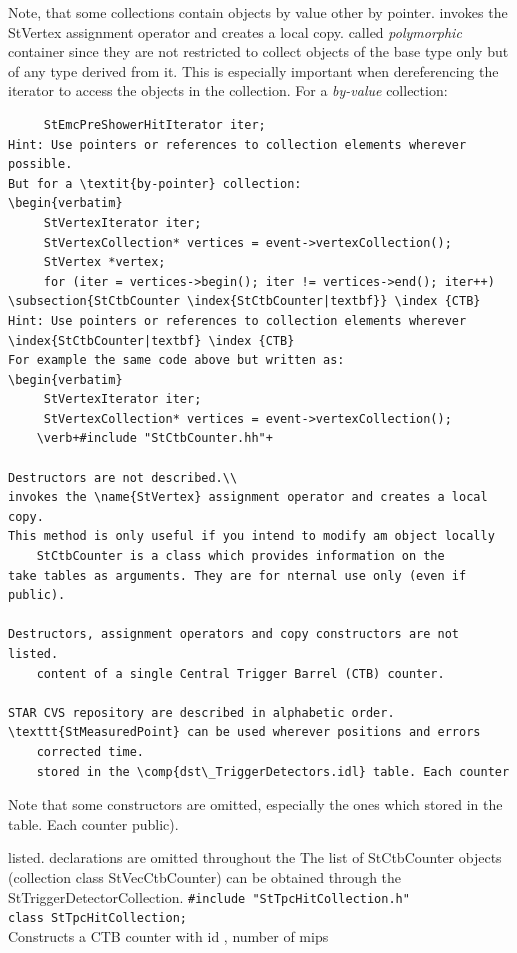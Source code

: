Note, that some collections contain objects by value other by pointer.
invokes the StVertex assignment operator and creates a local copy.
called \textit{polymorphic} container since they are not restricted to
collect objects of the base type only but of any type derived from
it. This is especially important when dereferencing the iterator to
access the objects in the collection.  For a \textit{by-value}
collection:
\begin{verbatim}
     StEmcPreShowerHitIterator iter;
Hint: Use pointers or references to collection elements wherever possible.
But for a \textit{by-pointer} collection:
\begin{verbatim}
     StVertexIterator iter;
     StVertexCollection* vertices = event->vertexCollection();
     StVertex *vertex;
     for (iter = vertices->begin(); iter != vertices->end(); iter++)
\subsection{StCtbCounter \index{StCtbCounter|textbf}} \index {CTB}
Hint: Use pointers or references to collection elements wherever
\index{StCtbCounter|textbf} \index {CTB}
For example the same code above but written as:
\begin{verbatim}
     StVertexIterator iter;
     StVertexCollection* vertices = event->vertexCollection();
    \verb+#include "StCtbCounter.hh"+
    
Destructors are not described.\\
invokes the \name{StVertex} assignment operator and creates a local copy.
This method is only useful if you intend to modify am object locally
    StCtbCounter is a class which provides information on the
take tables as arguments. They are for nternal use only (even if public).

Destructors, assignment operators and copy constructors are not listed.
    content of a single Central Trigger Barrel (CTB) counter.  
    
STAR CVS repository are described in alphabetic order.
\texttt{StMeasuredPoint} can be used wherever positions and errors
    corrected time.
    stored in the \comp{dst\_TriggerDetectors.idl} table. Each counter
\end{verbatim}
Note that some constructors are omitted, especially the ones which
    stored in the  table. Each counter
public).

    
listed.   declarations are omitted throughout the
    The list of StCtbCounter objects (collection class StVecCtbCounter) can be obtained
    through the StTriggerDetectorCollection.
    \verb+#include "StTpcHitCollection.h"+\\
    \verb+class StTpcHitCollection;+\\
    Constructs a CTB counter with id , number of mips 
%
   
